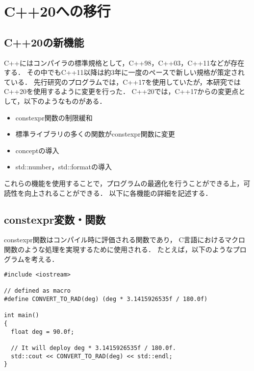 ﻿%

\chapter{C++20への移行}\label{chapter:付録A}
\section{C++20の新機能}
C++にはコンパイラの標準規格として，C++98，C++03，C++11などが存在する．
その中でもC++11以降は約3年に一度のペースで新しい規格が策定されている．
先行研究のプログラムでは，C++17を使用していたが，本研究ではC++20\cite{Thomas_C++20}を使用するように変更を行った．
C++20では，C++17からの変更点として，以下のようなものがある．
\begin{itemize}
  \item constexpr関数の制限緩和
  \item 標準ライブラリの多くの関数がconstexpr関数に変更
  \item conceptの導入
  \item std::number，std::formatの導入
\end{itemize}
これらの機能を使用することで，プログラムの最適化を行うことができる上，可読性を向上されることができる．
以下に各機能の詳細を記述する．

\section{constexpr変数・関数}
constexpr関数はコンパイル時に評価される関数であり，
C言語におけるマクロ関数のような処理を実現するために使用される．
たとえば，以下のようなプログラムを考える．

\begin{lstlisting}[caption=convert func as macro,label=convert_func_as_macro]
#include <iostream>

// defined as macro
#define CONVERT_TO_RAD(deg) (deg * 3.1415926535f / 180.0f)  

int main()
{
  float deg = 90.0f;
  
  // It will deploy deg * 3.1415926535f / 180.0f.
  std::cout << CONVERT_TO_RAD(deg) << std::endl;
}
\end{lstlisting}

